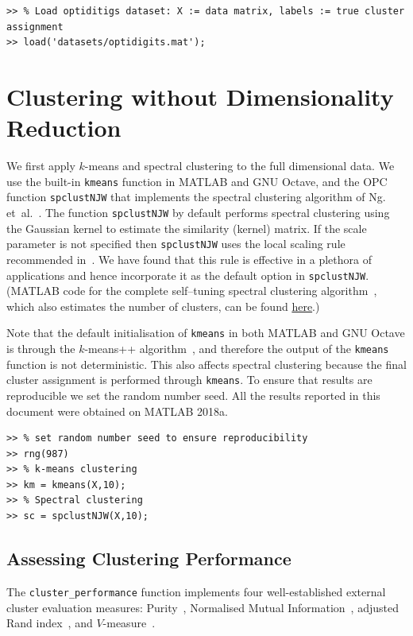 \documentclass{book}
\begin{document}
\begin{verbatim}
>> % Load optiditigs dataset: X := data matrix, labels := true cluster assignment
>> load('datasets/optidigits.mat');
\end{verbatim}


\section{Clustering without Dimensionality Reduction}

We first apply $k$-means and spectral clustering to the full dimensional data.
We use the built-in {\tt kmeans} function in MATLAB and GNU Octave, and the OPC
function {\tt spclustNJW} that implements the spectral clustering algorithm of
Ng.  et~al.~\cite{NgJW2001}. 
%
The function {\tt spclustNJW} by default performs spectral clustering using
the Gaussian kernel to estimate the similarity (kernel) matrix.
%
If the scale parameter is not specified then {\tt spclustNJW} uses the local scaling
rule recommended in~\cite{Zelnik2004}. We have found that this
rule is effective in a plethora of applications and hence incorporate it
as the default option in {\tt spclustNJW}. (MATLAB code for the complete
self--tuning spectral clustering algorithm~\cite{Zelnik2004},
which also
estimates the number of clusters, can be found
\href{http://lihi.eew.technion.ac.il/files/Demos/SelfTuningClustering.html}{here}.)

%
Note that the default initialisation of {\tt kmeans} in both MATLAB and GNU Octave
is through the $k$-means++ algorithm~\cite{ArthurV2007}, and
therefore the output of the {\tt kmeans} function is not deterministic. This also
affects spectral clustering because the final
cluster assignment is performed through {\tt kmeans}. To ensure that 
results are reproducible we set the random number
seed.
%
All the results reported in this document were obtained on MATLAB 2018a.

\begin{verbatim}
>> % set random number seed to ensure reproducibility
>> rng(987)
>> % k-means clustering
>> km = kmeans(X,10);
>> % Spectral clustering
>> sc = spclustNJW(X,10);
\end{verbatim}

\subsection{Assessing Clustering Performance}

The {\tt cluster\_performance} function implements four well-established
external cluster evaluation measures: Purity~\cite{ZhaoK2004}, Normalised
Mutual Information~\cite{StrehlG2002}, adjusted Rand
index~\cite{Hubert1985}, and $V$-measure~\cite{Rosenberg2007}.
\end{document}
